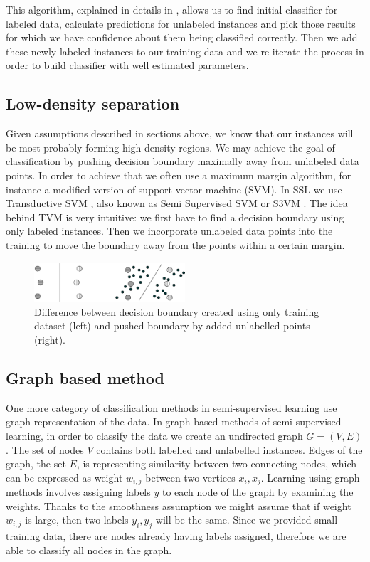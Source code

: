 \documentclass[12pt, a4paper, pdflatex]{report}
\begin{document}
This algorithm, explained in details in \cite{chapelle06}, allows us to find initial classifier for labeled data, calculate predictions for unlabeled instances and pick those results for which we have confidence about them being classified correctly. Then we add these newly labeled instances to our training data and we re-iterate the process in order to build classifier with well estimated parameters.

\subsection{Low-density separation}

Given assumptions described in sections above, we know that our instances will be most probably forming high density regions. We may achieve the goal of classification by pushing decision boundary maximally away from unlabeled data points.
In order to achieve that we often use a maximum margin algorithm, for instance a modified version of support vector machine (SVM)\cite{chapelle06,Zhu06semi}. In SSL we use Transductive SVM \cite{chapelle06}, also known as Semi Supervised SVM or S3VM \cite{Zhu06semi}.
The idea behind TVM is very intuitive: we first have to find a decision boundary using only labeled instances. Then we incorporate unlabeled data points into the training to move the boundary away from the points within a certain margin.

\begin{figure}[htbp]
\centering
\includegraphics[width=0.5\textwidth]{graphics/s3vm.png}
\caption{ Difference between decision boundary created using only training dataset (left) and pushed boundary by added unlabelled points (right).\label{fig:SvmMethodFig}}
\end{figure}

\subsection{Graph based method}

One more category of classification methods in semi-supervised learning use graph representation of the data. In graph based methods of semi-supervised learning, in order to classify the data we create an undirected graph $ G = (V, E) $. The set of nodes $ V $ contains both labelled and unlabelled instances. Edges of the graph, the set $ E $, is representing similarity between two connecting nodes, which can be expressed as weight $ w_{i,j} $ between two vertices $x_{i}, x_{j} $. Learning using graph methods involves assigning labels $ y $ to each node of the graph by examining the weights. Thanks to the smoothness assumption we might assume that if weight $ w_{i,j} $ is large, then two labels $ y_i, y_j $ will be the same. Since we provided small training data, there are nodes already having labels assigned, therefore we are able to classify all nodes in the graph\cite{Zhu06semi}.
\end{document}
